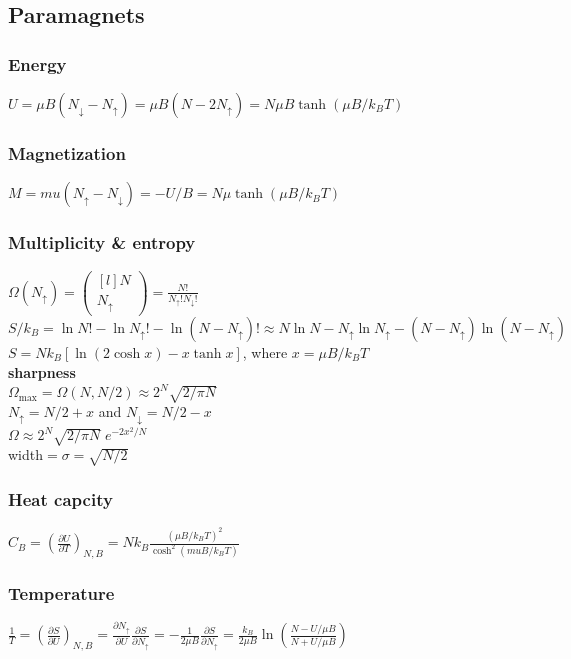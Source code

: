 \documentclass[letterpaper,landscape,10pt]{article}
\begin{document}
{\begin{multicols}{4}
	\subsection*{Paramagnets}
	\subsubsection*{Energy}
	$U = \mu B(N_{\downarrow}-N_\uparrow) = \mu B(N-2N_\uparrow) = N\mu B \tanh(\mu B/k_BT)$
	\subsubsection*{Magnetization}
	$M = mu(N_\uparrow-N_\downarrow)=-U/B = N\mu \tanh(\mu B/k_BT)$
	\subsubsection*{Multiplicity \& entropy}
	  $\Omega(N_\uparrow)=\begin{pmatrix}[l]N\\N_\uparrow\end{pmatrix}=\frac{N!}{N_{\uparrow}!N_\downarrow!}$ \\
	  $S/k_B = \ln N! - \ln N_\uparrow! - \ln(N-N_\uparrow)! \approx N\ln N - N_\uparrow \ln N_\uparrow - (N-N_\uparrow)\ln(N-N_\uparrow)$ \\
	  $S = Nk_B\left[ \ln(2\cosh x)-x\tanh x \right]$, where $x=\mu B/k_BT$ \\
	  \textbf{sharpness} \\
	  $\Omega_{\textrm{max}} = \Omega(N,N/2)\approx 2^N \sqrt{2/\pi N}$ \\
	  $N_\uparrow = N/2+x$ and $N_\downarrow = N/2-x$ \\
	  $\Omega\approx 2^N \sqrt{2/\pi N} \; e^{-2x^2/N}$ \\
	  width$= \sigma = \sqrt{N/2}$

	\subsubsection*{Heat capcity}
	$C_B = \left( \frac{\partial U}{\partial T} \right)_{N,B} = Nk_B\frac{\left( \mu B / k_BT \right)^2}{\cosh^2\left( mu B/k_BT \right)}$
	\subsubsection*{Temperature}
	$\frac{1}{T} = (\frac{\partial S}{\partial U})_{N,B} = \frac{\partial N_\uparrow}{\partial U}\frac{\partial S}{\partial N_\uparrow} = -\frac{1}{2\mu B}\frac{\partial S}{\partial N_\uparrow} = \frac{k_B}{2\mu B}\ln\left( \frac{N-U/\mu B}{N+U/\mu B} \right)$ \\


\end{multicols}}
\end{document}
